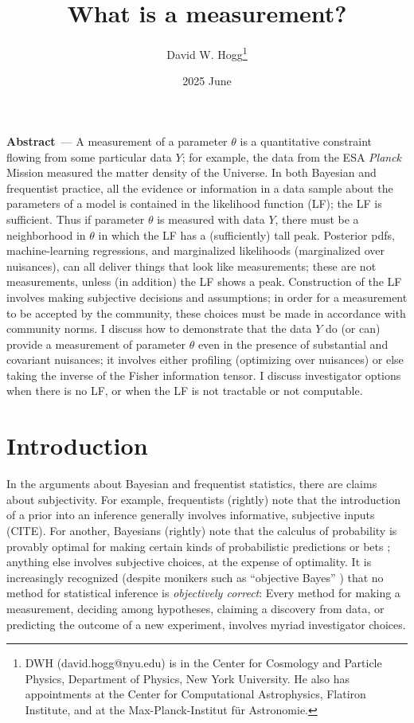 \documentclass{article}
\title{\bfseries
What is a measurement?}
\author{David W. Hogg\footnote{%
DWH (david.hogg@nyu.edu) is in the Center for Cosmology and Particle Physics, Department of Physics, New York University.
He also has appointments at the Center for Computational Astrophysics, Flatiron Institute, and at the Max-Planck-Institut f\"ur Astronomie.}}
\date{2025 June}
\renewcommand{\paragraph}[1]{\bigskip\par\noindent\textbf{#1}~---}
\begin{document}
\maketitle\thispagestyle{empty}

\paragraph{Abstract}
A measurement of a parameter $\theta$ is a quantitative constraint flowing from some particular data $Y$; for example, the data from the ESA \textsl{Planck} Mission measured the matter density of the Universe.
In both Bayesian and frequentist practice, all the evidence or information in a data sample about the parameters of a model is contained in the likelihood function (LF); the LF is sufficient.
Thus if parameter $\theta$ is measured with data $Y$, there must be a neighborhood in $\theta$ in which the LF has a (sufficiently) tall peak.
Posterior pdfs, machine-learning regressions, and marginalized likelihoods (marginalized over nuisances), can all deliver things that look like measurements; these are not measurements, unless (in addition) the LF shows a peak.
Construction of the LF involves making subjective decisions and assumptions; in order for a measurement to be accepted by the community, these choices must be made in accordance with community norms.
I discuss how to demonstrate that the data $Y$ do (or can) provide a measurement of parameter $\theta$ even in the presence of substantial and covariant nuisances; it involves either profiling (optimizing over nuisances) or else taking the inverse of the Fisher information tensor.
I discuss investigator options when there is no LF, or when the LF is not tractable or not computable.

\section{Introduction}\label{sec:intro}
In the arguments about Bayesian and frequentist statistics, there are claims about subjectivity.
For example, frequentists (rightly) note that the introduction of a prior into an inference generally involves informative, subjective inputs (CITE).
For another, Bayesians (rightly) note that the calculus of probability is provably optimal for making certain kinds of probabilistic predictions or bets \cite{jaynes}; anything else involves subjective choices, at the expense of optimality.
It is increasingly recognized (despite monikers such as ``objective Bayes'' \cite{objective}) that no method for statistical inference is \emph{objectively correct}:
Every method for making a measurement, deciding among hypotheses, claiming a discovery from data, or predicting the outcome of a new experiment, involves myriad investigator choices.
\end{document}
